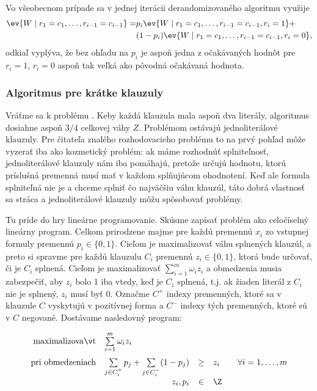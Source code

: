 \noindent
Vo všeobecnom  prípade sa v jednej iterácii derandomizovaného algoritmu využije
\begin{align*}
\ev{W\mid r_1=c_1,\ldots,r_{i-1}=c_{i-1}}=&
p_i\ev{W\mid r_1=c_1,\ldots,r_{i-1}=c_{i-1},r_i=1} +\\
&(1-p_i)\ev{W\mid r_1=c_1,\ldots,r_{i-1}=c_{i-1},r_i=0},
\end{align*}
odkiaľ vyplýva, že bez ohľadu na $p_i$ je
aspoň jedna z očakávaných hodnôt pre $r_i=1$, $r_i=0$  aspoň tak veľká ako 
pôvodná očakávaná hodnota.

\subsubsection*{Algoritmus pre krátke klauzuly}

\noindent
Vráťme sa k problému \maxsat. 
Keby každá klauzula mala aspoň dva literály, algoritmus  dosiahne aspoň $3/4$ celkovej váhy $Z$.
Problémom ostávajú jednoliterálové klauzuly. Pre čitateľa znalého rozhodovacieho problému \sat to na prvý
pohľad môže vyzerať iba ako kozmetický problém: ak máme rozhodnúť splniteľnosť, jednoliterálové klauzuly nám 
iba pomáhajú, pretože určujú hodnotu, ktorú príslušná premenná musí mať v každom splňujúcom ohodnotení.
Keď ale formula splniteľná nie je a chceme splniť čo najväčšiu váhu klauzúl, táto dobrá vlastnosť sa stráca
a jednoliterálové klauzuly môžu spôsobovať problémy.

\noindent
Tu príde do hry lineárne programovanie. Skúsme zapísať problém \maxsat ako celočíselný lineárny program.
Celkom prirodzene majme pre každú premennú $x_i$ zo vstupnej formuly premennú $p_i\in\{0,1\}$. Cieľom je
maximalizovať váhu splnených klauzúl, a preto si spravme pre každú klauzulu $C_i$ premennú $z_i\in\{0,1\}$,
ktorá bude určovať, či je $C_i$ splnená. Cieľom je maximalizovať $\sum_{i=1}^m\omega_iz_i$ a obmedzenia
musia zabezpečiť, aby $z_i$ bolo 1 iba vtedy, keď je $C_i$ splnená, t.j. ak žiaden literál z $C_i$  nie je splnený,
$z_i$ musí byť 0. Označme $C^+$ indexy premenných, ktoré sa
v klauzule $C$ vyskytujú v pozitívnej forma a $C^-$ indexy tých premenných, ktoré sú v $C$ negované. Dostávame
nasledovný program:


\begin{equation}
\label{LP:maxsat:prog1}
\begin{array}{rrcll}
{\rm maximalizovať}     & \multicolumn{1}{l}{ \sum\limits_{i=1}^m\omega_iz_i}\\[3ex]
{\rm pri\ obmedzeniach} & \sum\limits_{j\in C_i^+}p_j + \sum\limits_{j\in C_i^-}(1-p_j) &\ge&z_i& \;\;\;
                            \forall i=1,\ldots,m \\
                        & z_i,p_i&\in&\Z
\end{array}
\end{equation}

